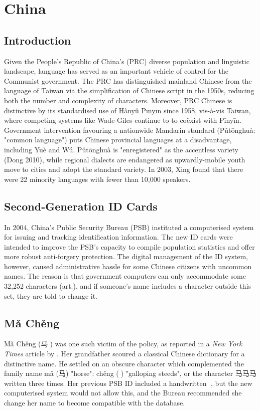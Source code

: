 \section{China}

\subsection{Introduction}

Given the People's Republic of China's (PRC) diverse population and linguistic
landscape, language has served as an important vehicle of control for the
Communist government. The PRC has distinguished mainland Chinese from the
language of Taiwan via the simplification of Chinese script in the 1950s,
reducing both the number and complexity of characters. Moreover, PRC Chinese is
distinctive by its standardised use of Hànyǔ Pīnyīn since 1958, vis-à-vis
Taiwan, where competing systems like Wade-Giles continue to to coëxist with
Pīnyīn. Government intervention favouring a nationwide Mandarin standard
(Pǔtōnghuà: "common language") puts Chinese provincial languages at a
disadvantage, including Yuè and Wú. Pǔtōnghuà is "enregistered" as the
accentless variety (Dong 2010), while regional dialects are endangered as
upwardly-mobile youth move to cities and adopt the standard variety. In 2003,
Xing found that there were 22 minority languages with fewer than 10,000
speakers.

\subsection{Second-Generation ID Cards}

In 2004, China's Public Security Bureau (PSB) instituted a computerised system for
issuing and tracking identification information. The new ID cards were intended
to improve the PSB's capacity to compile population statistics and offer more
robust anti-forgery protection. The digital management of the ID system,
however, caused administrative hassle for some Chinese citizens with uncommon
names. The reason is that government computers can only accommodate some 32,252
characters (art.), and if someone's name includes a character outside this set,
they are told to change it.

\subsection{Mǎ Chěng}

Mǎ Chěng ({\zafont 马}{\zbfont 𩧢}) was one such victim of the policy, as reported
in a \textit{New York Times} article by \textcite{lafraniere09}. Her grandfather
scoured a classical Chinese dictionary for a distinctive name. He settled on an
obscure character which complemented the family name mǎ ({\zafont 马}) "horse":
chěng ({\zbfont 𩧢}) "galloping steeds", or the character {\zafont 马马马} written
three times. Her previous PSB ID included a handwritten {\zbfont 𩧢}, but the new
computerised system would not allow this, and the Bureau recommended she change
her name to become compatible with the database.

